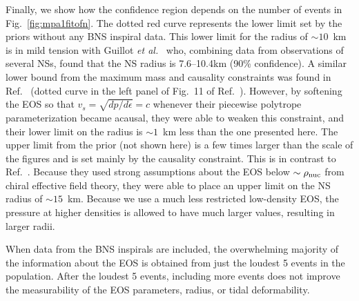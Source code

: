\documentclass[twocolumn,prd,amssymb,aps,nofootinbib,showpacs,epsf]{revtex4}
\begin{document}
Finally, we show how the confidence region depends on the number of events in Fig.~\ref{fig:mpa1fitofn}. The dotted red curve represents the lower limit set by the priors without any BNS inspiral data. This lower limit for the radius of $\sim 10$~km is in mild tension with Guillot {\it et al.}~\cite{GuillotServillatWebb2013} who, combining data from observations of several NSs, found that the NS radius is 7.6--10.4km (90\% confidence). A similar lower bound from the maximum mass and causality constraints was found in Ref.~\cite{HebelerLattimerPethick2013} (dotted curve in the left panel of Fig.~11 of Ref.~\cite{HebelerLattimerPethick2013}). However, by softening the EOS so that $v_s = \sqrt{dp/d\epsilon} = c$ whenever their piecewise polytrope parameterization became acausal, they were able to weaken this constraint, and their lower limit on the radius is $\sim 1$~km less than the one presented here. The upper limit from the prior (not shown here) is a few times larger than the scale of the figures and is set mainly by the causality constraint. This is in contrast to Ref.~\cite{HebelerLattimerPethick2013}. Because they used strong assumptions about the EOS below $\sim \rho_{\rm nuc}$ from chiral effective field theory, they were able to place an upper limit on the NS radius of $\sim 15$~km. Because we use a much less restricted low-density EOS, the pressure at higher densities is allowed to have much larger values, resulting in larger radii.

When data from the BNS inspirals are included, the overwhelming majority of the information about the EOS is obtained from just the loudest 5 events in the population. After the loudest 5 events, including more events does not improve the measurability of the EOS parameters, radius, or tidal deformability.
\end{document}
